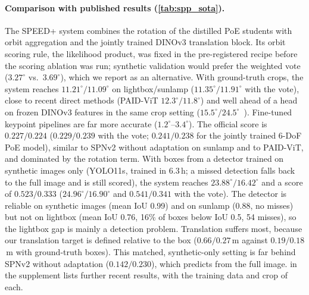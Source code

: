 \begin{table}[t]
  \centering\small
  \setlength{\tabcolsep}{3.5pt}
  
  \caption{\textbf{SPEED+ real domains} (lightbox LB, sunlamp SL): mean rotation error and the official SPEED+ score (rotation error in radians plus normalised translation error, averaged over images; lower is better). Published values as reported by each source. $^*$\,uses real or unlabelled test-domain images during training or adaptation. $^\dagger$\,ensemble of 3 models. Settings differ (detector or ground-truth crop, fine-tuned or frozen backbone), so only rows with the same setting are matched comparisons.}
  \label{tab:spp_sota}
\end{table}

\paragraph{Comparison with published results (\cref{tab:spp_sota}).} The SPEED+ system combines the rotation of the distilled PoE students with orbit aggregation and the jointly trained DINOv3 translation block. Its orbit scoring rule, the likelihood product, was fixed in the pre-registered recipe before the scoring ablation was run; synthetic validation would prefer the weighted vote ($3.27^\circ$ vs.\ $3.69^\circ$), which we report as an alternative. With ground-truth crops, the system reaches $11.21^\circ/11.09^\circ$ on lightbox/sunlamp ($11.35^\circ/11.91^\circ$ with the vote), close to recent direct methods (PAID-ViT $12.3^\circ/11.8^\circ$) and well ahead of a head on frozen DINOv3 features in the same crop setting ($15.5^\circ/24.5^\circ$~\cite{church2026vfm}). Fine-tuned keypoint pipelines are far more accurate ($1.2^\circ$--$3.4^\circ$). The official score is $0.227/0.224$ ($0.229/0.239$ with the vote; $0.241/0.238$ for the jointly trained 6-DoF PoE model), similar to SPNv2 without adaptation on sunlamp and to PAID-ViT, and dominated by the rotation term.
With boxes from a detector trained on synthetic images only (YOLO11s, trained in 6.3\,h; a missed detection falls back to the full image and is still scored), the system reaches $23.88^\circ/16.42^\circ$ and a score of $0.523/0.333$ ($24.96^\circ/16.90^\circ$ and $0.541/0.341$ with the vote). The detector is reliable on synthetic images (mean IoU 0.99) and on sunlamp (0.88, no misses) but not on lightbox (mean IoU 0.76, 16\% of boxes below IoU 0.5, 54 misses), so the lightbox gap is mainly a detection problem. Translation suffers most, because our translation target is defined relative to the box ($0.66/0.27$\,m against $0.19/0.18$\,m with ground-truth boxes). This matched, synthetic-only setting is far behind SPNv2 without adaptation ($0.142/0.230$), which predicts from the full image.  in the supplement lists further recent results, with the training data and crop of each.


